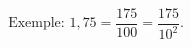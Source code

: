 \documentclass[preview]{standalone}
\begin{document}
\begin{align*}
\text{Exemple: } 1,75 = \dfrac{175}{100} = \dfrac{175}{10^2}.
\end{align*}
\end{document}
